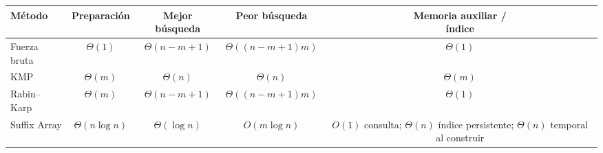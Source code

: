 \begin{center}
\small
\begin{tabular}{@{}lcccc@{}}
\toprule
\textbf{Método} & \textbf{Preparación} & \textbf{Mejor búsqueda} &
\textbf{Peor búsqueda} & \shortstack{\textbf{Memoria auxiliar /}\\\textbf{índice}} \\
\midrule
Fuerza bruta & \(\Theta(1)\) & \(\Theta(n - m + 1)\) & \(\Theta((n - m + 1)m)\) & \(\Theta(1)\) \\
KMP & \(\Theta(m)\) & \(\Theta(n)\) & \(\Theta(n)\) & \(\Theta(m)\) \\
Rabin--Karp & \(\Theta(m)\) & \(\Theta(n - m + 1)\) & \(\Theta((n - m + 1)m)\) & \(\Theta(1)\) \\
Suffix Array & \(\Theta(n \log n)\) & \(\Theta(\log n)\) & \(O(m \log n)\) & \shortstack{\(O(1)\) consulta;\\\(\Theta(n)\) índice persistente;\\\(\Theta(n)\) temporal al construir} \\
\bottomrule
\end{tabular}
\end{center}
